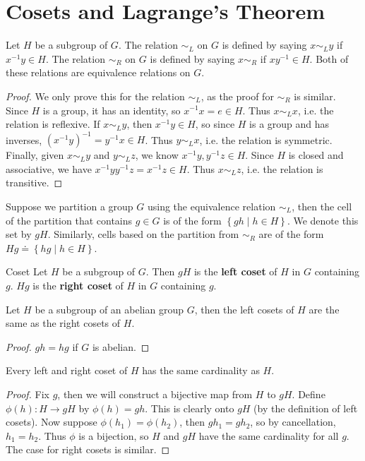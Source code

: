 \documentclass[10pt]{report}
\begin{document}

\section{Cosets and Lagrange's Theorem}


\begin{thrm}{}{}
Let $H$ be a subgroup of $G$. The relation $\sim_L$ on $G$ is defined by saying $x \sim_L y$ if $x^{-1}y \in H$. The relation $\sim_R$ on $G$ is defined by saying $x \sim_R$ if $xy^{-1} \in H$. Both of these relations are equivalence relations on $G$.
\end{thrm}
\begin{proof}
	We only prove this for the relation $\sim_L$, as the proof for $\sim_R$ is similar. Since $H$ is a group, it has an identity, so $x^{-1} x = e \in H$. Thus $x \sim_L x$, i.e. the relation is reflexive. If $x \sim_L y$, then $x^{-1}y \in H$, so since $H$ is a group and has inverses, $(x^{-1}y)^{-1}=y^{-1}x\in H$. Thus $y \sim_L x$, i.e. the relation is symmetric. Finally, given $x \sim_L y$ and $y \sim_L z$, we know $x^{-1}y, y^{-1}z \in H$. Since $H$ is closed and associative, we have $x^{-1}yy^{-1}z = x^{-1}z \in H$. Thus $x \sim_L z$, i.e. the relation is transitive.
\end{proof}

Suppose we partition a group $G$ using the equivalence relation $\sim_L$, then the cell of the partition that contains $g \in G$ is of the form $\left\{ gh \;|\; h \in H \right\}$. We denote this set by $gH$. Similarly, cells based on the partition from $\sim_R$ are of the form $Hg \doteq \left\{ hg \;|\; h \in H \right\}$.

\begin{defn}{Coset}{}
Let $H$ be a subgroup of $G$. Then $gH$ is the \textbf{left coset} of $H$ in $G$ containing $g$. $Hg$ is the \textbf{right coset} of $H$ in $G$ containing $g$.
\end{defn}

\begin{prop}
	Let $H$ be a subgroup of an abelian group $G$, then the left cosets of $H$ are the same as the right cosets of $H$.
\end{prop}
\begin{proof}
	$gh=hg$ if $G$ is abelian.
\end{proof}

\begin{prop}
	Every left and right coset of $H$ has the same cardinality as $H$.
\end{prop}
\begin{proof}
	Fix $g$, then we will construct a bijective map from $H$ to $gH$. Define $\phi(h):H\to gH$ by $\phi(h)=gh$. This is clearly onto $gH$ (by the definition of left cosets). Now suppose $\phi(h_1)=\phi(h_2)$, then $gh_1=gh_2$, so by cancellation, $h_1=h_2$. Thus $\phi$ is a bijection, so $H$ and $gH$ have the same cardinality for all $g$. The case for right cosets is similar.
\end{proof}
\end{document}
